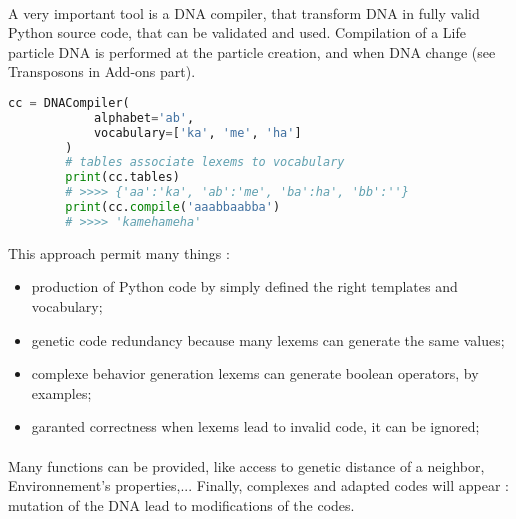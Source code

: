 \documentclass{report} %
\begin{document}
    \paragraph*{}
    A very important tool is a DNA compiler, that transform DNA in fully valid Python source code, that can be validated and used.
    Compilation of a Life particle DNA is performed at the particle creation, and when DNA change (see Transposons in Add-ons part).
    \begin{lstlisting}[language=Python]
        cc = DNACompiler(
            alphabet='ab', 
            vocabulary=['ka', 'me', 'ha']
        )
        # tables associate lexems to vocabulary
        print(cc.tables) 
        # >>>> {'aa':'ka', 'ab':'me', 'ba':ha', 'bb':''}
        print(cc.compile('aaabbaabba')
        # >>>> 'kamehameha'
    \end{lstlisting}
    This approach permit many things :
    \begin{itemize}
        \item production of Python code by simply defined the right templates and vocabulary;
        \item genetic code redundancy because many lexems can generate the same values;
        \item complexe behavior generation lexems can generate boolean operators, by examples;
        \item garanted correctness when lexems lead to invalid code, it can be ignored;
    \end{itemize}
    \newpage

    \paragraph*{}
    Many functions can be provided, like access to genetic distance of a neighbor, Environnement's properties,...
    Finally, complexes and adapted codes will appear : mutation of the DNA lead to modifications of the codes.
\end{document}
